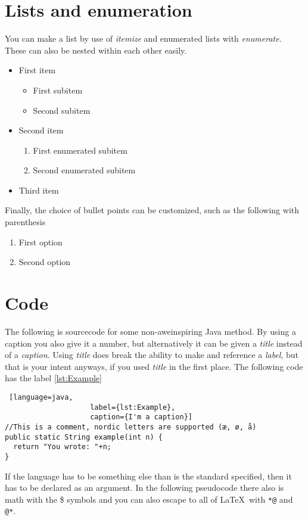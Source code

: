 \documentclass[english]{article}
\begin{document}
\section{Lists and enumeration}
You can make a list by use of \emph{itemize} and enumerated lists with
\emph{enumerate}. These can also be nested within each other easily.
\begin{itemize}
\item First item
  \begin{itemize}
  \item First subitem
  \item Second subitem
  \end{itemize}
\item Second item
  \begin{enumerate}
  \item First enumerated subitem
  \item Second enumerated subitem
  \end{enumerate}
\item Third item
\end{itemize}
Finally, the choice of bullet points can be customized, such as the following
with parenthesis
\begin{enumerate}[label=(\alph*)]
\item First option
\item Second option
\end{enumerate}

\section{Code}
The following is sourcecode for some non-aweinspiring Java method. By using a
caption you also give it a number, but alternatively it can be given a
\emph{title} instead of a \emph{caption}. Using \emph{title} does break the
ability to make and reference a \emph{label}, but that is your intent anyways,
if you used \emph{title} in the first place. The following code has the label
\ref{lst:Example}

\begin{lstlisting} [language=java,
                    label={lst:Example},
                    caption={I'm a caption}]
//This is a comment, nordic letters are supported (æ, ø, å)
public static String example(int n) {
  return "You wrote: "+n;
}
\end{lstlisting}

If the language has to be something else than is the standard specified, then it
has to be declared as an argument. In the following pseudocode there also is
math with the \$ symbols and you can also escape to all of \LaTeX\ with
\lstinline{*@} and \lstinline{@*}.
\end{document}
